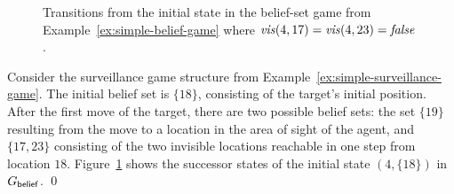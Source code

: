 

\begin{figure}


\vspace{-.3cm}
\caption{Transitions from the initial state in the belief-set game from Example~\ref{ex:simple-belief-game} where $\mathit{vis}(4,17) = \mathit{vis}(4,23) = \mathit{false}$.}
\label{fig:simple-belief-game}
\vspace{-.5cm}
\end{figure}

\begin{example}\label{ex:simple-belief-game}
Consider the surveillance game structure from Example~\ref{ex:simple-surveillance-game}. The initial belief set is $\{18\}$, consisting of the target's initial position. After the first move of the target, there are two possible belief sets: the set $\{19\}$ resulting from the move to a location in the area of sight of the agent, and $\{17,23\}$ consisting of the two invisible locations reachable in one step from location $18$.
Figure~\ref{fig:simple-belief-game} shows the successor states of the initial state $(4,\{18\})$ in $G_{\mathsf{belief}}$. \qed
\end{example}

